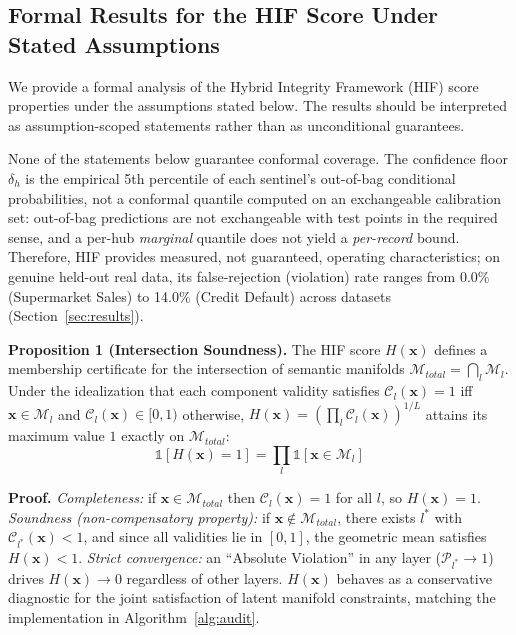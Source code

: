 \documentclass[pdflatex,sn-mathphys-num]{sn-jnl}
\theoremstyle{thmstyleone}%
\theoremstyle{thmstyletwo}%
\theoremstyle{thmstylethree}%
\begin{document}
\begin{appendices}

\section{Formal Results for the HIF Score Under Stated Assumptions}\label{app:formal_results}

We provide a formal analysis of the Hybrid Integrity Framework (HIF) score properties under the assumptions stated below. The results should be interpreted as assumption-scoped statements rather than as unconditional guarantees.

None of the statements below guarantee conformal coverage. The confidence floor $\delta_h$ is the empirical 5th percentile of each sentinel's out-of-bag conditional probabilities, not a conformal quantile computed on an exchangeable calibration set: out-of-bag predictions are not exchangeable with test points in the required sense, and a per-hub \emph{marginal} quantile does not yield a \emph{per-record} bound. Therefore, HIF provides measured, not guaranteed, operating characteristics; on genuine held-out real data, its false-rejection (violation) rate ranges from 0.0\% (Supermarket Sales) to 14.0\% (Credit Default) across datasets (Section~\ref{sec:results}).

\textbf{Proposition 1 (Intersection Soundness).} The HIF score $H(\mathbf{x})$ defines a membership certificate for the intersection of semantic manifolds $\mathcal{M}_{total} = \bigcap_{l} \mathcal{M}_l$. Under the idealization that each component validity satisfies $\mathcal{C}_l(\mathbf{x}) = 1$ iff $\mathbf{x} \in \mathcal{M}_l$ and $\mathcal{C}_l(\mathbf{x}) \in [0, 1)$ otherwise, $H(\mathbf{x}) = \left( \prod_l \mathcal{C}_l(\mathbf{x}) \right)^{1/L}$ attains its maximum value $1$ exactly on $\mathcal{M}_{total}$:
\begin{equation}
    \mathbb{1}[H(\mathbf{x}) = 1] = \prod_{l} \mathbb{1}[\mathbf{x} \in \mathcal{M}_l]
\end{equation}

\textbf{Proof.} \emph{Completeness:} if $\mathbf{x} \in \mathcal{M}_{total}$ then $\mathcal{C}_l(\mathbf{x}) = 1$ for all $l$, so $H(\mathbf{x}) = 1$. \emph{Soundness (non-compensatory property):} if $\mathbf{x} \notin \mathcal{M}_{total}$, there exists $l^*$ with $\mathcal{C}_{l^*}(\mathbf{x}) < 1$, and since all validities lie in $[0,1]$, the geometric mean satisfies $H(\mathbf{x}) < 1$. \emph{Strict convergence:} an ``Absolute Violation'' in any layer ($\mathcal{P}_{l^*} \to 1$) drives $H(\mathbf{x}) \to 0$ regardless of other layers. $H(\mathbf{x})$ behaves as a conservative diagnostic for the joint satisfaction of latent manifold constraints, matching the implementation in Algorithm~\ref{alg:audit}.


\end{appendices}
\end{document}
